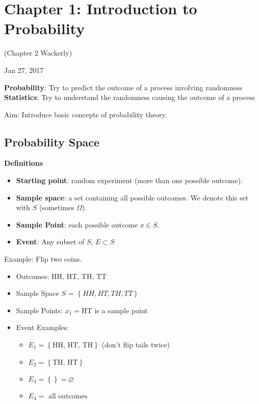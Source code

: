 \documentclass[main.tex]{subfiles}
\begin{document}
\section{Chapter 1: Introduction to Probability}
(Chapter 2 Wackerly)

Jan 27, 2017

\vspace{3mm}

\textbf{Probability}: Try to predict the outcome of a process involving randomness
\textbf{Statistics}: Try to understand the randomness causing the outcome of a process

Aim: Introduce basic concepts of probability theory.

\subsection{Probability Space}

\textbf{Definitions}

\begin{itemize}

\item \textbf{Starting point}: random experiment (more than one possible outcome).

\item \textbf{Sample space}: a set containing all possible outcomes. We denote this set with $S$ (sometimes $\Omega$).

\item \textbf{Sample Point}: each possible outcome $x\in S$.

\item \textbf{Event}: Any subset of $S$, $E\subset S$
\end{itemize}

Example: Flip two coins.
\begin{itemize}
    \item Outcomes: HH, HT, TH, TT
    \item Sample Space $S$ = $\left\{HH, HT, TH, TT\right\}$
    \item Sample Points: $x_1 = $HT is a sample point
    \item Event Examples:
    \begin{itemize}
        \item $E_1 = \left\{\textrm{HH, HT, TH}\right\}$ (don't flip tails twice)
        \item $E_2 = \left\{\textrm{TH, HT}\right\}$
        \item $E_3 = \left\{\right\} = \varnothing$
        \item $E_4 = \textrm{ all outcomes}$
    \end{itemize}
\end{itemize}
\end{document}
